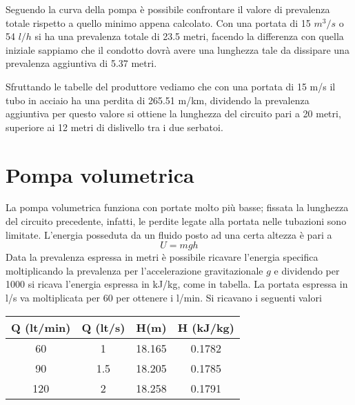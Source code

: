 \documentclass[a4paper,12pt]{article}
\begin{document}
Seguendo la curva della pompa è possibile confrontare il valore di prevalenza totale rispetto a quello minimo appena calcolato.
Con una portata di 15 $m^3/s$ o 54 $l/h$ si ha una prevalenza totale di 23.5 metri, facendo la differenza con quella iniziale sappiamo che
il condotto dovrà avere una lunghezza tale da dissipare una prevalenza aggiuntiva di 5.37 metri.

Sfruttando le tabelle del produttore vediamo che con una portata di 15 m/s il tubo in acciaio ha una perdita di 265.51 m/km, dividendo la prevalenza aggiuntiva
per questo valore si ottiene la lunghezza del circuito pari a 20 metri, superiore ai 12 metri di dislivello tra i due serbatoi.

\section{Pompa volumetrica}
La pompa volumetrica funziona con portate molto più basse; fissata la lunghezza del circuito precedente, infatti, le perdite legate alla portata nelle tubazioni sono limitate.
L'energia posseduta da un fluido posto ad una certa altezza è pari a 
\begin{equation}
    U = mgh
\end{equation}
Data la prevalenza espressa in metri è possibile ricavare l'energia specifica moltiplicando la prevalenza per l'accelerazione gravitazionale $g$ e dividendo per 1000 si ricava 
l'energia espressa in kJ/kg, come in tabella. La portata espressa in l/s va moltiplicata per 60 per ottenere i l/min.
Si ricavano i seguenti valori
\begin{center}
    \begin{tabular}{c|c|c|c}
        Q (lt/min)  &   Q (lt/s)&H(m)   &H (kJ/kg)  \\ \hline
        60          &   1       &18.165 &0.1782     \\ \hline
        90          &   1.5     &18.205 &0.1785     \\ \hline
        120         &   2       &18.258 &0.1791     \\ \hline
    \end{tabular}
\end{center}
\end{document}
